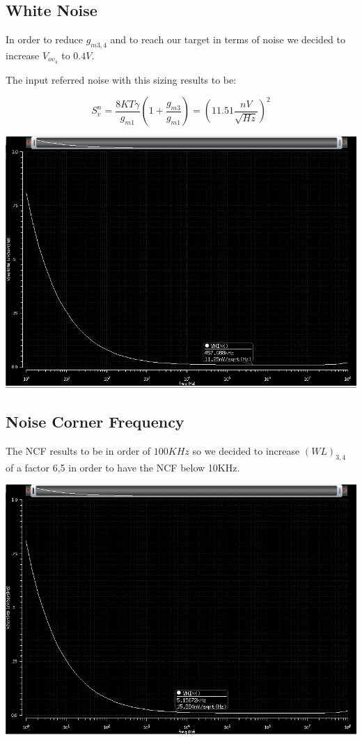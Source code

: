 \subsection{White Noise} %
\label{ssub:white_noise}

In order to reduce $g_{m3,4}$ and to reach our target in terms of noise we decided to increase $V_{ov_4}$ to $0.4V.$

The input referred noise with this sizing results to be:

\begin{equation}
  S_v^n= \frac{8KT\gamma}{g_{m1}}(1+\frac{g_ {m3}}{g_{m1}}) = (11.51 \frac{nV}{\sqrt{Hz}})^2
\end{equation}


\centering
\includegraphics[width=1\textwidth]{Capitoli/wn1st.png}
\raggedright

\vfill

\subsection{Noise Corner Frequency} %
\label{ssub:noise_corner_frequency}

The NCF results to be in order of $100KHz$ so we decided to increase $(WL)_{3,4}$ of a factor 6,5 in order to have the NCF below 10KHz.


\centering
\includegraphics[width=1\textwidth]{Capitoli/ncf1.png}
\raggedright

